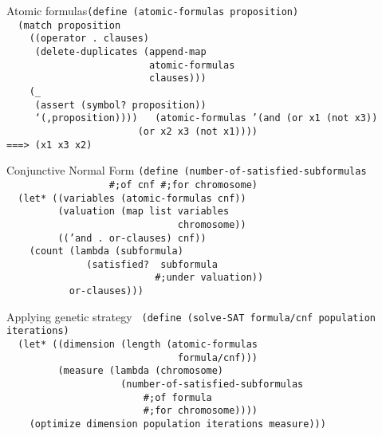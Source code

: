 \documentclass{beamer}
\begin{document}
\begin{frame}{Atomic formulas}\texttt{(define (atomic-formulas proposition)
    \\ \pause
\ \ (match proposition\\ \pause
\ \ \ \ ((operator . clauses)\\ \pause
\ \ \ \ \ (delete-duplicates (append-map \\
\ \ \ \ \ \ \ \ \ \ \ \ \ \ \ \ \ \ \ \ \ \ \ \ \ atomic-formulas \\
\ \ \ \ \ \ \ \ \ \ \ \ \ \ \ \ \ \ \ \ \ \ \ \ \ clauses)))\\ \pause
\ \ \ \ (\_ \\ \pause
\ \ \ \ \ (assert (symbol? proposition)) \\
\ \ \ \ \ `(,proposition)))) \\ \pause
\ \\
(atomic-formulas '(and (or x1 (not x3))\\
\ \ \ \ \ \ \ \ \ \ \ \ \ \ \ \ \ \ \ \ \ \ \ (or x2 x3 (not x1)))) \\ \pause
===> (x1 x3 x2)
  }
\end{frame}

\begin{frame}{Conjunctive Normal Form}
  \texttt{(define (number-of-satisfied-subformulas \\ 
    \ \ \ \ \ \ \ \ \ \ \ \ \ \ \ \ \ \ \#;of cnf \#;for chromosome) \\ \pause
\ \ (let* ((variables (atomic-formulas cnf)) \\ \pause
\ \ \ \ \ \ \ \ \ (valuation (map list variables \\
\ \ \ \ \ \ \ \ \ \ \ \ \ \ \ \ \ \ \ \ \ \ \ \ \ \ \ \ \ \ chromosome)) \\ \pause
\ \ \ \ \ \ \ \ \ (('and . or-clauses) cnf)) \\ \pause
\ \ \ \ (count (lambda (subformula) \\
\ \ \ \ \ \ \ \ \ \ \ \ \ \ (satisfied?\,\,subformula \\
\ \ \ \ \ \ \ \ \ \ \ \ \ \ \ \ \ \ \ \ \ \ \ \ \ \ \#;under valuation)) \\
\ \ \ \ \ \ \ \ \ \ \ or-clauses)))}
\end{frame}

\begin{frame}{Applying genetic strategy}
  \texttt{\footnotesize
    (define (solve-SAT formula/cnf population iterations) \\ \pause
\ \ (let* ((dimension (length (atomic-formulas \\
\ \ \ \ \ \ \ \ \ \ \ \ \ \ \ \ \ \ \ \ \ \ \ \ \ \ \ \ \ \ formula/cnf)))\\ \pause
\ \ \ \ \ \ \ \ \ (measure (lambda (chromosome) \\
\ \ \ \ \ \ \ \ \ \ \ \ \ \ \ \ \ \ \ \ (number-of-satisfied-subformulas \\
\ \ \ \ \ \ \ \ \ \ \ \ \ \ \ \ \ \ \ \ \ \ \ \ \#;of formula \\
\ \ \ \ \ \ \ \ \ \ \ \ \ \ \ \ \ \ \ \ \ \ \ \ \#;for chromosome)))) \\ \pause
\ \ \ \ (optimize dimension population iterations measure)))}
\end{frame}

\end{document}
